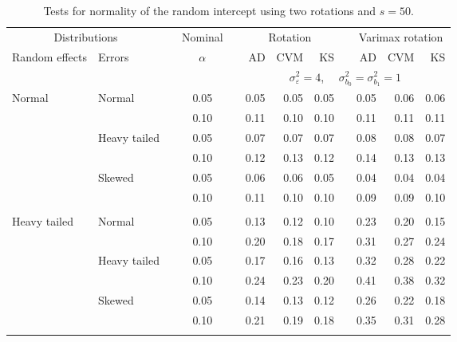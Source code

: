 \begin{table}[ht]
\caption{\label{tab:simb050}Tests for normality of the random intercept using two rotations and $s = 50$.}
\begin{scriptsize}
\begin{center}
\begin{tabular}{ll p{.1cm} c p{.1cm} rrr p{.1cm} rrr}
  \hline
  \multicolumn{2}{c}{Distributions}& & Nominal & &  \multicolumn{3}{c}{Rotation} & & \multicolumn{3}{c}{Varimax rotation} \\ \cline{1-2} \cline{6-8} \cline{10-12}   
  Random effects & Errors & & $\alpha$ & & AD & CVM & KS & & AD & CVM & KS \\ 
   \hline
& && && \multicolumn{7}{c}{$\sigma_{\varepsilon}^2 = 4$, \ \ $\sigma_{b_0}^2 = \sigma_{b_1}^2 = 1$} \\ \cline{6-12}
\rowcolor{gray!20}Normal       & Normal       && 0.05 &&   0.05 & 0.05 & 0.05 && 0.05 & 0.06 & 0.06 \\ 
\rowcolor{gray!20}             &              && 0.10 &&   0.11 & 0.10 & 0.10 && 0.11 & 0.11 & 0.11 \\ 
\rowcolor{gray!20}             & Heavy tailed && 0.05 &&   0.07 & 0.07 & 0.07 && 0.08 & 0.08 & 0.07 \\ 
\rowcolor{gray!20}             &              && 0.10 &&   0.12 & 0.13 & 0.12 && 0.14 & 0.13 & 0.13 \\ 
\rowcolor{gray!20}             & Skewed       && 0.05 &&   0.06 & 0.06 & 0.05 && 0.04 & 0.04 & 0.04 \\ 
\rowcolor{gray!20}             &              && 0.10 &&   0.11 & 0.10 & 0.10 && 0.09 & 0.09 & 0.10 \\ 
             &&&&&&&&&&&\\
Heavy tailed & Normal       && 0.05 &&   0.13 & 0.12 & 0.10 && 0.23 & 0.20 & 0.15 \\ 
             &              && 0.10 &&   0.20 & 0.18 & 0.17 && 0.31 & 0.27 & 0.24 \\ 
             & Heavy tailed && 0.05 &&   0.17 & 0.16 & 0.13 && 0.32 & 0.28 & 0.22 \\ 
             &              && 0.10 &&   0.24 & 0.23 & 0.20 && 0.41 & 0.38 & 0.32 \\ 
             & Skewed       && 0.05 &&   0.14 & 0.13 & 0.12 && 0.26 & 0.22 & 0.18 \\ 
             &              && 0.10 &&   0.21 & 0.19 & 0.18 && 0.35 & 0.31 & 0.28 \\ 
             &&&&&&&&&&&\\

\end{tabular}
\end{center}
\end{scriptsize}
\end{table}
